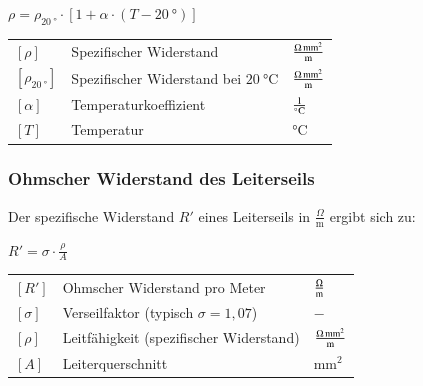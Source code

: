     \vspace{0.15cm}

    \begin{minipage}[t]{0.33\columnwidth}
        $
        \boxed{
        \rho = \rho_{\qty{20}{\degree}} \cdot \left[ 1 + \alpha \cdot \left(T - \qty{20}{\degree}\right) \right]
        }
        $ 
    \end{minipage}%
    \hfill
    \begin{minipage}[t]{0.65\columnwidth}
        \renewcommand{\arraystretch}{1.2}
        \begin{tabular}{l l l}
            $[\rho]$                    & Spezifischer Widerstand \dotfill                                & $\unit[per-mode=fraction]{\ohm\milli\metre\squared\per\metre}$ \\
            $[\rho_{\qty{20}{\degree}}]$& Spezifischer Widerstand bei $\qty{20}{\degreeCelsius}$ \dotfill & $\unit[per-mode=fraction]{\ohm\milli\metre\squared\per\metre}$ \\
            $[\alpha]$                  & Temperaturkoeffizient \dotfill                                  & $\unit[per-mode=fraction]{\per\degreeCelsius}$ \\
            $[T]$                       & Temperatur \dotfill                                             & $\unit{\degreeCelsius}$ \\
        \end{tabular}
    \end{minipage}

\subsubsection{Ohmscher Widerstand des Leiterseils}
    Der spezifische Widerstand $R'$ eines Leiterseils in $\frac{\Omega}{\text{m}}$ ergibt sich zu:

    \vspace{0.15cm}

    \begin{minipage}[t]{0.33\columnwidth}
        $
        \boxed{
        R' = \sigma \cdot \frac{\rho}{A}
        }
        $
    \end{minipage}%
    \hfill
    \begin{minipage}[t]{0.65\columnwidth}
        \renewcommand{\arraystretch}{1.2}
        \begin{tabular}{l l l}
            $[R']$      & Ohmscher Widerstand pro Meter \dotfill                & $\unit[per-mode=fraction]{\ohm\per\metre}$ \\
            $[\sigma]$  & Verseilfaktor (typisch $\sigma = 1{,}07$) \dotfill    & $-$ \\
            $[\rho]$    & Leitfähigkeit (spezifischer Widerstand) \dotfill      & $\unit[per-mode=fraction]{\ohm\milli\metre\squared\per\metre}$ \\
            $[A]$       & Leiterquerschnitt \dotfill                            & $\unit{\milli\metre\squared}$ \\
        \end{tabular}
    \end{minipage}

